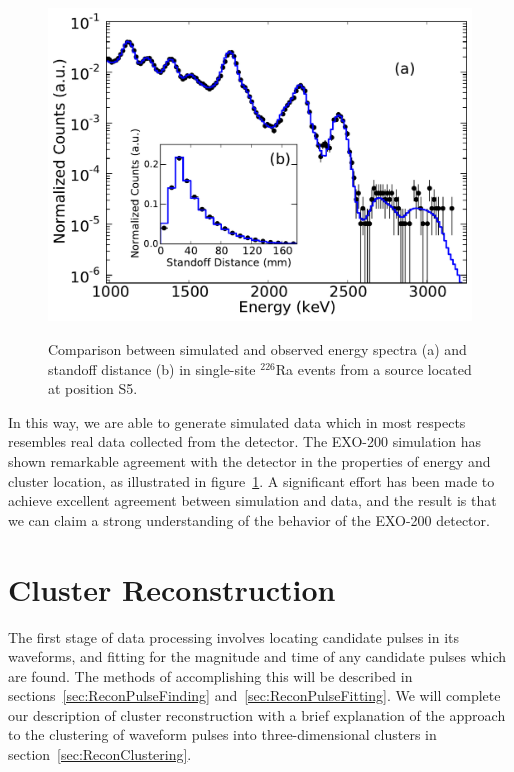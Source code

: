 \begin{figure}
\begin{center}
\includegraphics[keepaspectratio=true,width=\textwidth]{SS_Ra226_Campaign7.pdf}
\end{center}
\renewcommand{\baselinestretch}{1}
\small\normalsize
\begin{quote}
\caption{Comparison between simulated and observed energy spectra (a) and standoff distance (b) in single-site $^{226}$Ra events from a source located at position S5.~\cite{NewEXObb0nPaper_2014}}
\label{fig:RaSourceMCComparison}
\end{quote}
\end{figure}
\renewcommand{\baselinestretch}{2}
\small\normalsize

In this way, we are able to generate simulated data which in most respects resembles real data collected from the detector.  The EXO-200 simulation has shown remarkable agreement with the detector in the properties of energy and cluster location, as illustrated in figure~\ref{fig:RaSourceMCComparison}.  A significant effort has been made to achieve excellent agreement between simulation and data, and the result is that we can claim a strong understanding of the behavior of the EXO-200 detector.

\section{Cluster Reconstruction}\label{sec:ResultReconstruction}

The first stage of data processing involves locating candidate pulses in its waveforms, and fitting for the magnitude and time of any candidate pulses which are found.  The methods of accomplishing this will be described in sections~\ref{sec:ReconPulseFinding} and~\ref{sec:ReconPulseFitting}.  We will complete our description of cluster reconstruction with a brief explanation of the approach to the clustering of waveform pulses into three-dimensional clusters in section~\ref{sec:ReconClustering}.

